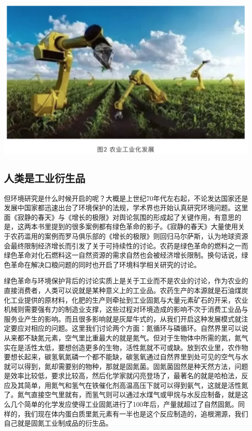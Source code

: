 \documentclass[
]{book}
\begin{document}
\includegraphics[width=6.67in]{images/renkou2}

\hypertarget{ux4ebaux7c7bux662fux5de5ux4e1aux884dux751fux54c1}{%
\subsection{人类是工业衍生品}\label{ux4ebaux7c7bux662fux5de5ux4e1aux884dux751fux54c1}}

但环境研究是什么时候开启的呢？大概是上世纪70年代左右起，不论发达国家还是发展中国家都迅速出台了环境保护的法规，学术界也开始认真研究环境问题。这里面《寂静的春天》与《增长的极限》对舆论氛围的形成起了关键作用，有意思的是，这两本书里提到的很多案例都有绿色革命的影子。《寂静的春天》大量使用关于农药滥用的案例而罗马俱乐部的《增长的极限》则回归马尔萨斯，认为地球资源会最终限制经济增长而引发了关于可持续性的讨论。农药是绿色革命的燃料之一而绿色革命对化石燃料这一自然资源的需求自然也会被经济增长限制。换句话说，绿色革命在解决口粮问题的同时也开启了环境科学相关研究的讨论。

绿色革命与环境保护背后的讨论实质上是关于工业而不是农业的讨论，作为农业的直接消费者，人类可以说就是某种意义上的工业品。农药生产的本源就是石油煤炭化工业提供的原材料，化肥的生产则牵扯到工业固氮与大量元素矿石的开采，农业机械则需要强有力的制造业支撑，这些过程对环境造成的影响不次于消费工业品与服务业产生的影响。而且很多影响就是灰犀牛式的，从我们开启这种发展模式就注定要应对相应的问题。这里我们讨论两个方面：氮循环与磷循环。自然界里可以说从来都不缺氮元素，空气里比重最大的就是氮气。但对于生物体中所需的氮，氮气实在是活性太低，要想创造更多的生物，活性氮就不可或缺。放到农业里，农作物要想长起来，碳氢氧氮磷一个都不能缺，碳氢氧通过自然界里到处可见的空气与水就可以得到，氮却需要别的物种，那就是固氮菌。固氮菌固然是种天然方法，问题是效率比较低，要求比较高，然后化学家就闪亮登场了，最著名的就是哈柏法，反应及其简单，用氮气和氢气在铁催化剂高温高压下就可以得到氨气，这就是活性氮了。氮气直接空气里就有，而氢气则可以通过水煤气或甲烷与水反应制备，就是这么几个简单的化学发应使得工业固氮进行了100年后，产量就超过了自然固氮。同样的，我们现在体内蛋白质里氮元素有一半也是这个反应制造的，追根溯源，我们自己就是固氮工业制成品的衍生品。
\end{document}
